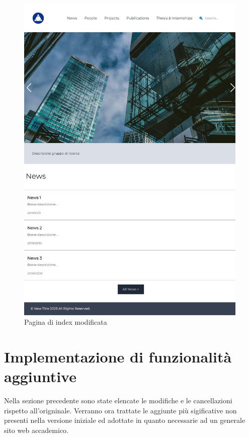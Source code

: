 \documentclass[target=bach,aauheader=]{thud}
\begin{document}
\begin{figure}
\begin{minipage}{0.5\textwidth}
      \includegraphics[width=0.99\textwidth]{images/index-finale.jpeg}
      \caption{Pagina di index modificata}
      \label{img:indexfi}
    \end{minipage}
\end{figure}

\section{Implementazione di funzionalità aggiuntive} 
Nella sezione precedente sono state elencate le modifiche e le cancellazioni rispetto all'origninale. 
Verranno ora trattate le aggiunte più sigificative non presenti nella versione iniziale ed adottate in quanto necessarie ad un generale sito web accademico. 

\end{document}
